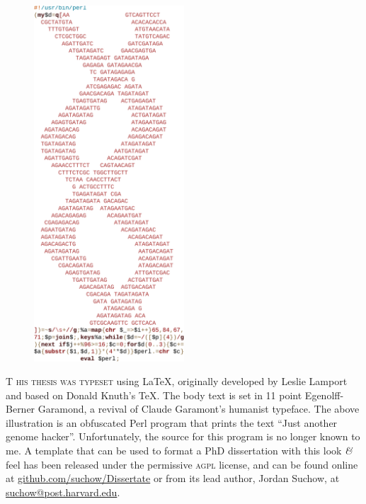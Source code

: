 \newpage

\begin{figure}[h!]
  \centering
  \includegraphics[width=0.5\textwidth]{endmatter/jagh}
\end{figure}

\newpage

\begin{center}
\parbox{200pt}{\lettrine[lines=3,slope=-2pt,nindent=-4pt]{\textcolor{SchoolColor}{T}}{ his thesis was typeset} using \LaTeX, originally developed by Leslie Lamport and based on Donald Knuth's \TeX. The body text is set in 11 point Egenolff-Berner Garamond, a revival of Claude Garamont's humanist typeface. The above illustration is an obfuscated Perl program that prints the text ``Just another genome hacker''. Unfortunately, the source for this program is no longer known to me. A template that can be used to format a PhD dissertation with this look \textit{\&} feel has been released under the permissive \textsc{agpl} license, and can be found online at \href{https://github.com/suchow/Dissertate}{github.com/suchow/Dissertate} or from its lead author, Jordan Suchow, at \href{mailto:suchow@post.harvard.edu}{suchow@post.harvard.edu}.}
\end{center}
